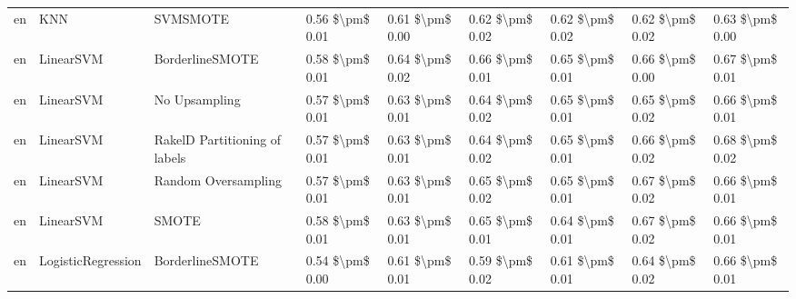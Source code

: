 \begin{tabular}{lllllllll}
      en &                             KNN &                      SVMSMOTE & 0.56 \$\textbackslash pm\$ 0.01 &           0.61 \$\textbackslash pm\$ 0.00 &       0.62 \$\textbackslash pm\$ 0.02 &        0.62 \$\textbackslash pm\$ 0.02 &                         0.62 \$\textbackslash pm\$ 0.02 &     0.63 \$\textbackslash pm\$ 0.00 \\
      en &                       LinearSVM &               BorderlineSMOTE & 0.58 \$\textbackslash pm\$ 0.01 &           0.64 \$\textbackslash pm\$ 0.02 &       0.66 \$\textbackslash pm\$ 0.01 &        0.65 \$\textbackslash pm\$ 0.01 &                         0.66 \$\textbackslash pm\$ 0.00 &     0.67 \$\textbackslash pm\$ 0.01 \\
      en &                       LinearSVM &                 No Upsampling & 0.57 \$\textbackslash pm\$ 0.01 &           0.63 \$\textbackslash pm\$ 0.01 &       0.64 \$\textbackslash pm\$ 0.02 &        0.65 \$\textbackslash pm\$ 0.01 &                         0.65 \$\textbackslash pm\$ 0.02 &     0.66 \$\textbackslash pm\$ 0.01 \\
      en &                       LinearSVM & RakelD Partitioning of labels & 0.57 \$\textbackslash pm\$ 0.01 &           0.63 \$\textbackslash pm\$ 0.01 &       0.64 \$\textbackslash pm\$ 0.02 &        0.65 \$\textbackslash pm\$ 0.01 &                         0.66 \$\textbackslash pm\$ 0.02 &     0.68 \$\textbackslash pm\$ 0.02 \\
      en &                       LinearSVM &           Random Oversampling & 0.57 \$\textbackslash pm\$ 0.01 &           0.63 \$\textbackslash pm\$ 0.01 &       0.65 \$\textbackslash pm\$ 0.02 &        0.65 \$\textbackslash pm\$ 0.01 &                         0.67 \$\textbackslash pm\$ 0.02 &     0.66 \$\textbackslash pm\$ 0.01 \\
      en &                       LinearSVM &                         SMOTE & 0.58 \$\textbackslash pm\$ 0.01 &           0.63 \$\textbackslash pm\$ 0.01 &       0.65 \$\textbackslash pm\$ 0.01 &        0.64 \$\textbackslash pm\$ 0.01 &                         0.67 \$\textbackslash pm\$ 0.02 &     0.66 \$\textbackslash pm\$ 0.01 \\
      en &              LogisticRegression &               BorderlineSMOTE & 0.54 \$\textbackslash pm\$ 0.00 &           0.61 \$\textbackslash pm\$ 0.01 &       0.59 \$\textbackslash pm\$ 0.02 &        0.61 \$\textbackslash pm\$ 0.01 &                         0.64 \$\textbackslash pm\$ 0.02 &     0.66 \$\textbackslash pm\$ 0.01 \\

\end{tabular}
